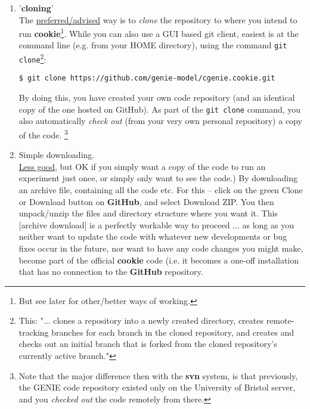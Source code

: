 \begin{enumerate}

\vspace{1mm}
\item '\textbf{cloning}'
\\The \uline{preferred/advised} way is to \textit{clone} the repository to where you intend to run \textbf{cookie}\footnote{But see later for other/better ways of working.}. While you can also use a GUI based git client, easiest is at the command line (e.g. from your HOME directory), using the command \texttt{git clone}\footnote{This: "... clones a repository into a newly created directory, creates remote-tracking branches for each branch in the cloned repository, and creates and checks out an initial branch that is forked from the cloned repository’s currently active branch."}:
\vspace{-1mm}
\begin{verbatim}
$ git clone https://github.com/genie-model/cgenie.cookie.git
\end{verbatim}
\vspace{-1mm}

By doing this, you have created your own code repository (and an identical copy of the one hosted on GitHub). As part of the \texttt{git clone} command, you also automatically \textit{check out} (from your very own personal repository) a copy of the code. \footnote{Note that the major difference then with the \textbf{svn} system, is that previously, the GENIE code repository existed only on the University of Bristol server, and you \textit{checked out} the code remotely from there.}

\vspace{1mm}
\item Simple downloading.
\\\uline{Less good}, but OK if you simply want a copy of the code to run an experiment just once, or simply only want to see the code.) By downloading an archive file, containing all the code etc. For this -- click on the \textcolor[rgb]{0,0.501961,0}{green} \textsf{\footnotesize Clone or Download} button on \textbf{GitHub}, and select \textsf{\footnotesize Download ZIP}. You then unpack/unzip the files and directory structure where you want it. This [archive download] is a perfectly workable way to proceed ... as long as you neither want to update the code with whatever new developments or bug fixes occur in the future, nor want to have any code changes you might make, become part of the official \textbf{cookie} code  (i.e. it becomes a one-off installation that has no connection to the \textbf{GitHub} repository.

\end{enumerate}

